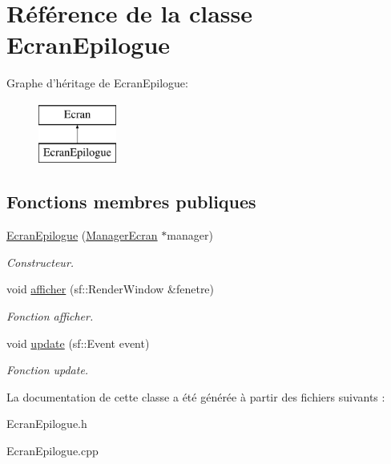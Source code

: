\hypertarget{classEcranEpilogue}{\section{\-Référence de la classe \-Ecran\-Epilogue}
\label{classEcranEpilogue}
}
\-Graphe d'héritage de \-Ecran\-Epilogue\-:\begin{figure}[H]
\begin{center}
\leavevmode
\includegraphics[height=2.000000cm]{classEcranEpilogue}
\end{center}
\end{figure}
\subsection*{\-Fonctions membres publiques}
\begin{DoxyCompactItemize}
\item 
\hypertarget{classEcranEpilogue_a6fca8536eefc58e5f4e28e6da0742384}{\hyperlink{classEcranEpilogue_a6fca8536eefc58e5f4e28e6da0742384}{\-Ecran\-Epilogue} (\hyperlink{classManagerEcran}{\-Manager\-Ecran} $\ast$manager)}\label{classEcranEpilogue_a6fca8536eefc58e5f4e28e6da0742384}

\begin{DoxyCompactList}\small\item\em \-Constructeur. \end{DoxyCompactList}\item 
\hypertarget{classEcranEpilogue_adc329838b8e9dedbf436396b44e10ac7}{void \hyperlink{classEcranEpilogue_adc329838b8e9dedbf436396b44e10ac7}{afficher} (sf\-::\-Render\-Window \&fenetre)}\label{classEcranEpilogue_adc329838b8e9dedbf436396b44e10ac7}

\begin{DoxyCompactList}\small\item\em \-Fonction afficher. \end{DoxyCompactList}\item 
\hypertarget{classEcranEpilogue_a4398f6b82b14fa43f9581b7d37206e20}{void \hyperlink{classEcranEpilogue_a4398f6b82b14fa43f9581b7d37206e20}{update} (sf\-::\-Event event)}\label{classEcranEpilogue_a4398f6b82b14fa43f9581b7d37206e20}

\begin{DoxyCompactList}\small\item\em \-Fonction update. \end{DoxyCompactList}\end{DoxyCompactItemize}


\-La documentation de cette classe a été générée à partir des fichiers suivants \-:\begin{DoxyCompactItemize}
\item 
\-Ecran\-Epilogue.\-h\item 
\-Ecran\-Epilogue.\-cpp\end{DoxyCompactItemize}
